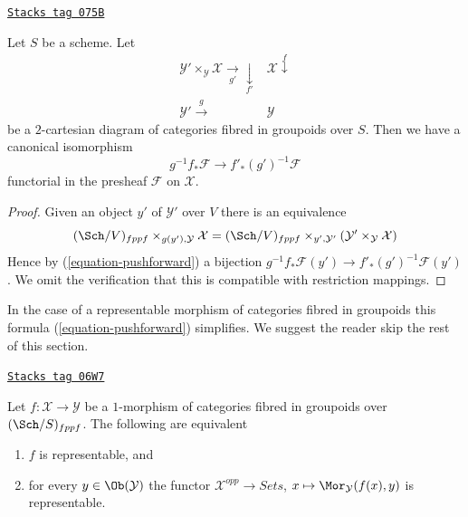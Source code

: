 \begin{lemma}
\label{stacks-sheaves-lemma-base-change}
\href{https://stacks.math.columbia.edu/tag/075B}{\texttt{Stacks tag 075B}}

Let $S$ be a scheme. Let
$$
\begin{array}{cc}\mathcal{Y}' \times_\mathcal{Y} \mathcal{X} \underset{g'}{\longrightarrow}\underset{f'}{\downarrow} & \mathcal{X} \overset{f}{\downarrow} \\ \mathcal{Y}' \overset{g}{\longrightarrow} & \mathcal{Y}\end{array}
$$
be a $2$-cartesian diagram of categories fibred in groupoids over $S$.
Then we have a canonical isomorphism
$$
g^{-1}f_*\mathcal{F} \longrightarrow f'_*(g')^{-1}\mathcal{F}
$$
functorial in the presheaf $\mathcal{F}$ on $\mathcal{X}$.
\end{lemma}

\begin{proof}
Given an object $y'$ of $\mathcal{Y}'$ over $V$
there is an equivalence
$$
(\Sch/V)_{fppf} \times_{g(y'), \mathcal{Y}} \mathcal{X}
=
(\Sch/V)_{fppf} \times_{y', \mathcal{Y}'}
(\mathcal{Y}' \times_\mathcal{Y} \mathcal{X})
$$
Hence by (\ref{equation-pushforward}) a bijection
$g^{-1}f_*\mathcal{F}(y') \to f'_*(g')^{-1}\mathcal{F}(y')$.
We omit the verification that this is compatible with restriction
mappings.
\end{proof}

In the case of a representable morphism of categories fibred in groupoids
this formula (\ref{equation-pushforward}) simplifies. We suggest the
reader skip the rest of this section.

\begin{lemma}[Representable]
\label{stacks-sheaves-lemma-representable}
\href{https://stacks.math.columbia.edu/tag/06W7}{\texttt{Stacks tag 06W7}}

Let $f : \mathcal{X} \to \mathcal{Y}$ be a $1$-morphism of categories
fibred in groupoids over $(\Sch/S)_{fppf}$. The following are
equivalent
\begin{enumerate}
\item $f$ is representable, and
\item for every $y \in \Ob(\mathcal{Y})$ the functor
$\mathcal{X}^{opp} \to \textit{Sets}$,
$x \mapsto \Mor_\mathcal{Y}(f(x), y)$
is representable.
\end{enumerate}
\end{lemma}

